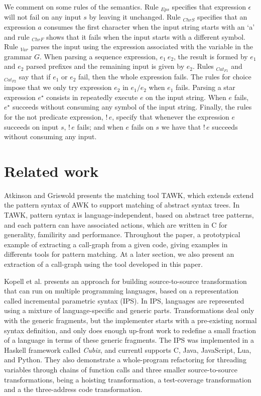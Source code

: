 \documentclass[10pt,sigplan,screen,review,anonymous]{acmart}
\begin{document}
We comment on some rules of the semantics. Rule $_{Eps}$ specifies that
expression $\epsilon$ will not fail on any input $s$ by leaving it unchanged.
Rule $_{ChrS}$ specifies that an expression $a$ consumes the first character when
the input string starts with an `a' and rule $_{ChrF}$ shows that it fails when
the input starts with a different symbol. Rule $_{Var}$ parses the input using
the expression associated with the variable in the grammar $G$. When parsing a
sequence expression, $e_1\:e_2$, the result is formed by $e_1$ and $e_2$ parsed
prefixes and the remaining input is given by $e_2$. Rules $_{Cat_{F1}}$ and
$_{Cat_{F2}}$ say that if $e_1$ or $e_2$ fail, then the whole expression fails.
The rules for choice impose that we only try
expression $e_2$ in $e_1 / e_2$ when $e_1$ fails. Parsing a star
expression $e^\star$ consists in repeatedly execute $e$ on the input string.
When $e$ fails, $e^\star$ succeeds without consuming any symbol of the input
string. Finally, the rules for the not predicate expression, $!\,e$, specify
that whenever the expression $e$ succeeds on input $s$, $!\,e$ fails; and when $e$
fails on $s$ we have that $!\,e$ succeeds without consuming any input.



\section{Related work}

Atkinson and Griswold\cite{atkinson2006-effective-pattern-matching} presents 
the matching tool TAWK, which extends extend the pattern syntax of AWK to 
support matching of abstract syntax trees. In TAWK, pattern syntax is 
language-independent, based on abstract tree patterns, and each pattern can 
have associated actions, which are written in C for generality, familirity 
and performance. Throughout the paper, a prototypical example of extracting 
a call-graph from a given code, giving examples in differents tools for 
pattern matching.
At a later section, we also present an extraction of a call-graph using the
tool developed in this paper.

Kopell et al.\cite{kopell2018-language-parametric-transformation} presents an
approach for building source-to-source transformation that can run on multiple
programming languages, based on a representation called incremental parametric
syntax (IPS).
In IPS, languages are represented using a mixture of language-specific and 
generic parts. Transformations deal only with the generic fragments, but 
the implementer starts with a pre-existing normal syntax definition, and 
only does enough up-front work to redefine a small fraction of a language 
in terms of these generic fragments.
The IPS was implemented in a Haskell framework called \textit{Cubix}, 
and currentl supports C, Java, JavaScript, Lua, and Python.
They also demonstrate a whole-program refactoring for threading variables
through chains of function calls and three smaller source-to-source 
transformations, being a hoisting transformation, a test-coverage 
transformation and a the three-address code transformation.
\end{document}
